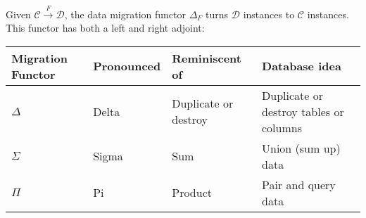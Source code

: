 Given $\mathcal{C}\xrightarrow{F}\mathcal{D}$, the data migration functor $\Delta_F$ turns $\mathcal{D}$ instances to $\mathcal{C}$ instances. This functor has both a left and right adjoint: 

\begin{minipage}{0.48\textwidth}
  \begin{tabular}{|l|l|l|l|}
    \hline
    Migration Functor & Pronounced & Reminiscent of       & Database idea                          \\ \hline
    $\Delta$          & Delta      & Duplicate or destroy & Duplicate or destroy tables or columns \\ \hline
    $\Sigma$          & Sigma      & Sum                  & Union (sum up) data                    \\ \hline
    $\Pi$             & Pi         & Product              & Pair and query data                    \\ \hline
  \end{tabular}
\end{minipage}
